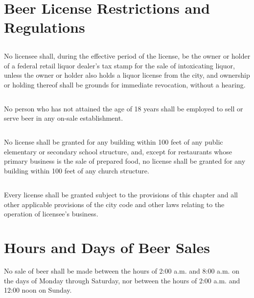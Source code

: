\section{Beer License Restrictions and Regulations}
\subsection{}
No licensee shall, during the effective period of the license, be the owner or holder of a federal retail liquor dealer’s tax stamp for the sale of intoxicating liquor, unless the owner or holder also holds a liquor license from the city, and ownership or holding thereof shall be grounds for immediate revocation, without a hearing.
\subsection{}
No person who has not attained the age of 18 years shall be employed to sell or serve beer in any on-sale establishment.
\subsection{}
No license shall be granted for any building within 100 feet of any public elementary or secondary school structure, and, except for restaurants whose primary business is the sale of prepared food, no license shall be granted for any building within 100 feet of any church structure.
\subsection{}
Every license shall be granted subject to the provisions of this chapter and all other applicable provisions of the city code and other laws relating to the operation of licensee’s business.

\section{Hours and Days of Beer Sales}
No sale of beer shall be made between the hours of 2:00 a.m. and 8:00 a.m. on the days of Monday through Saturday, nor between the hours of 2:00 a.m. and 12:00 noon on Sunday.

